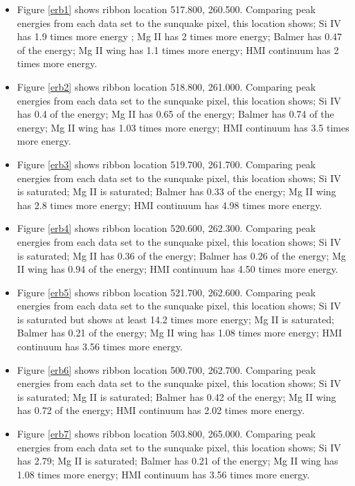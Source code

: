 \begin{itemize}
\item Figure \ref{erb1} shows ribbon location 517.800, 260.500. Comparing peak energies from each data set to the sunquake pixel, this location shows; Si IV has 1.9 times more energy ; Mg II has 2 times more energy; Balmer has 0.47 of the energy; Mg II wing has 1.1 times more energy; HMI continuum has 2 times more energy. 


\item Figure \ref{erb2} shows ribbon location 518.800, 261.000. Comparing peak energies from each data set to the sunquake pixel, this location shows; Si IV has 0.4 of the energy; Mg II has 0.65 of the energy; Balmer has 0.74 of the energy; Mg II wing has 1.03 times more energy; HMI continuum has 3.5 times more energy. 


\item Figure \ref{erb3} shows ribbon location 519.700, 261.700. Comparing peak energies from each data set to the sunquake pixel, this location shows; Si IV is saturated; Mg II is saturated; Balmer has 0.33 of the energy; Mg II wing has 2.8 times more energy; HMI continuum has 4.98 times more energy. 


\item Figure \ref{erb4} shows ribbon location 520.600, 262.300. Comparing peak energies from each data set to the sunquake pixel, this location shows; Si IV is saturated; Mg II has 0.36 of the energy; Balmer has 0.26 of the energy; Mg II wing has 0.94 of the energy; HMI continuum has 4.50 times more energy. 


\item Figure \ref{erb5} shows ribbon location 521.700, 262.600. Comparing peak energies from each data set to the sunquake pixel, this location shows; Si IV is saturated but shows at least 14.2 times more energy; Mg II is saturated; Balmer has 0.21 of the energy; Mg II wing has 1.08 times more energy; HMI continuum has 3.56 times more energy. 


\item Figure \ref{erb6} shows ribbon location 500.700, 262.700. Comparing peak energies from each data set to the sunquake pixel, this location shows; Si IV is saturated; Mg II is saturated; Balmer has 0.42 of the energy; Mg II wing has 0.72 of the energy; HMI continuum has 2.02 times more energy. 



\item Figure \ref{erb7} shows ribbon location 503.800, 265.000. Comparing peak energies from each data set to the sunquake pixel, this location shows; Si IV has 2.79; Mg II is saturated; Balmer has 0.21 of the energy; Mg II wing has 1.08 times more energy; HMI continuum has 3.56 times more energy. 




\end{itemize}
